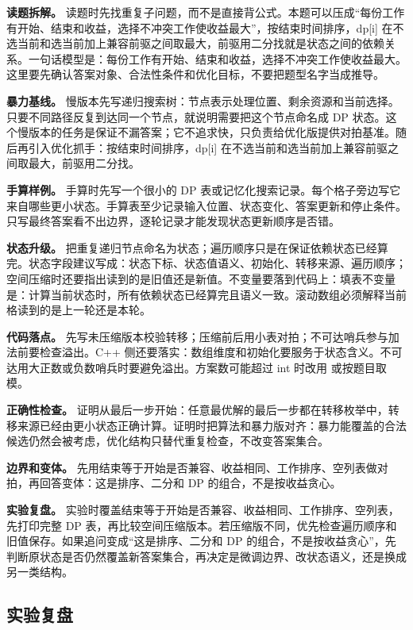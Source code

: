 \textbf{读题拆解。} 读题时先找重复子问题，而不是直接背公式。本题可以压成“每份工作有开始、结束和收益，选择不冲突工作使收益最大”，按结束时间排序，dp[i] 在不选当前和选当前加上兼容前驱之间取最大，前驱用二分找就是状态之间的依赖关系。一句话模型是：每份工作有开始、结束和收益，选择不冲突工作使收益最大。这里要先确认答案对象、合法性条件和优化目标，不要把题型名字当成推导。

\textbf{暴力基线。} 慢版本先写递归搜索树：节点表示处理位置、剩余资源和当前选择。只要不同路径反复到达同一个节点，就说明需要把这个节点命名成 DP 状态。这个慢版本的任务是保证不漏答案；它不追求快，只负责给优化版提供对拍基准。随后再引入优化抓手：按结束时间排序，dp[i] 在不选当前和选当前加上兼容前驱之间取最大，前驱用二分找。

\textbf{手算样例。} 手算时先写一个很小的 DP 表或记忆化搜索记录。每个格子旁边写它来自哪些更小状态。手算表至少记录输入位置、状态变化、答案更新和停止条件。只写最终答案看不出边界，逐轮记录才能发现状态更新顺序是否错。

\textbf{状态升级。} 把重复递归节点命名为状态；遍历顺序只是在保证依赖状态已经算完。状态字段建议写成：状态下标、状态值语义、初始化、转移来源、遍历顺序；空间压缩时还要指出读到的是旧值还是新值。不变量要落到代码上：填表不变量是：计算当前状态时，所有依赖状态已经算完且语义一致。滚动数组必须解释当前格读到的是上一轮还是本轮。

\textbf{代码落点。} 先写未压缩版本校验转移；压缩前后用小表对拍；不可达哨兵参与加法前要检查溢出。C++ 侧还要落实：数组维度和初始化要服务于状态含义。不可达用大正数或负数哨兵时要避免溢出。方案数可能超过 int 时改用  或按题目取模。

\textbf{正确性检查。} 证明从最后一步开始：任意最优解的最后一步都在转移枚举中，转移来源已经由更小状态正确计算。证明时把算法和暴力版对齐：暴力能覆盖的合法候选仍然会被考虑，优化结构只替代重复检查，不改变答案集合。

\textbf{边界和变体。} 先用结束等于开始是否兼容、收益相同、工作排序、空列表做对拍，再回答变体：这是排序、二分和 DP 的组合，不是按收益贪心。

\textbf{实验复盘。} 实验时覆盖结束等于开始是否兼容、收益相同、工作排序、空列表，先打印完整 DP 表，再比较空间压缩版本。若压缩版不同，优先检查遍历顺序和旧值保存。如果追问变成“这是排序、二分和 DP 的组合，不是按收益贪心”，先判断原状态是否仍然覆盖新答案集合，再决定是微调边界、改状态语义，还是换成另一类结构。

\subsection{实验复盘}

